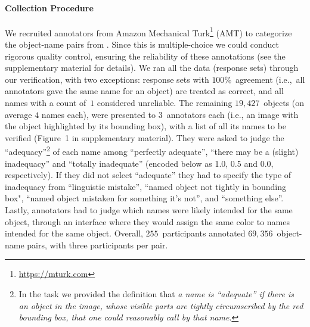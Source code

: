 
\paragraph{Collection Procedure}
\label{sect:mn_verification}

We recruited annotators from Amazon Mechanical Turk\footnote{
	\url{https://mturk.com}
} (AMT) to categorize the object-name pairs from \mn.
Since this is multiple-choice we could conduct rigorous quality control, ensuring the reliability of these annotations (see the supplementary material for details).
We ran all the \mn data (response sets) through our verification, with two exceptions: 
response sets with $100$\%~agreement (i.e.,~all annotators gave the same name for an object) are treated as correct, and all names with a count of~$1$ considered unreliable.
The remaining $19,427$~objects (on average $4$ names each), were presented to $3$~annotators each (i.e., an image with the object highlighted by its bounding box), with a list of all its names to be verified (Figure~1 in supplementary material).
They were asked to judge the ``adequacy''\footnote{
	In the task we provided the definition that \textit{a name is ``adequate'' if there is an object in the image, whose visible parts are tightly circumscribed by the red bounding box, that one could reasonably call by that name}.
} of each name among ``perfectly adequate'', ``there may be a (slight) inadequacy'' and ``totally inadequate'' (encoded below as 1.0, 0.5 and 0.0, respectively).
If they did not select ``adequate'' they had to specify the type of inadequacy from ``linguistic mistake'', ``named object not tightly in bounding box",  ``named object mistaken for something it's not'', and ``something else''.
Lastly, annotators had to judge which names were likely intended for the same object, through an interface where they would assign the same color to names intended for the same object.
Overall, $255$~participants annotated $69,356$~object-name pairs, with three participants per pair.




